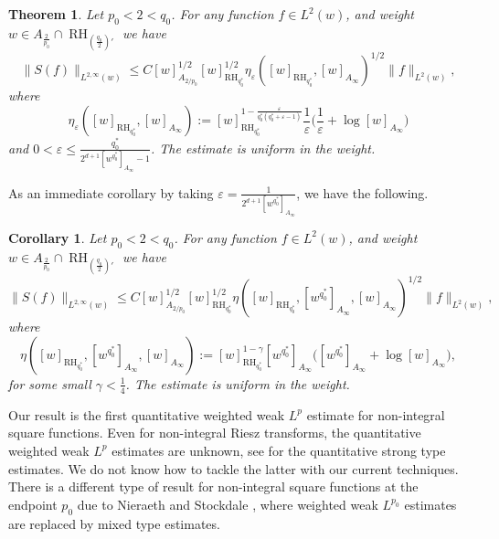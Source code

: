 \documentclass[11pt,reqno]{amsart}
\theoremstyle{plain} %
\newtheorem{theorem}[equation]{Theorem}
\newtheorem{corollary}[equation]{Corollary}
\newcommand{\1}{ \mathbbm{1}}   %
\theoremstyle{definition}
\theoremstyle{remark}
\numberwithin{equation}{section}
\begin{document}
\begin{theorem} 
\label{thm:main}
Let $p_0<2<q_0$. For any function $f\in L^2(w)$, and weight $w\in A_{\frac{2}{p_0}}\cap \operatorname{RH}_{(\frac{q_0}{2})'}$ we have
$$
\|S(f)\|_{L^{2,\infty}(w)} \le C [w]_{A_{2/p_0}}^{1/2} [w]_{ \operatorname{RH}_{q_0^*}}^{1/2}\eta_{\varepsilon} ([w]_{ \operatorname{RH}_{q_0^*}}, [w]_{A_{\infty}})^{1/2}\|f\|_{L^2(w)},
$$
where  
\begin{equation}\label{e.excess}
\eta_{\varepsilon} ([w]_{ \operatorname{RH}_{q_0^*}}, [w]_{A_{\infty}}) := [w]_{ \operatorname{RH}_{q_0^*}}^{1-\frac{\varepsilon}{q_0^*(q_0^*+\varepsilon-1)}}   \frac{1}{\varepsilon} \Big(   \frac{1}{\varepsilon} +\log[w]_{A_{\infty}}\Big)
\end{equation}
and $0 < \varepsilon \leq \frac{q_0^*}{2^{d+1} [w^{q_0^*}]_{A_{\infty}}-1 }$.
The estimate is uniform in the weight.
\end{theorem}

As an immediate corollary by taking $\varepsilon = \frac{1}{2^{d+1} [w^{q_0^*}]_{A_{\infty}}} $, we have the following.
\begin{corollary}
\label{cor:explicit}
  Let $p_0<2<q_0$. For any function $f\in L^2(w)$, and weight $w\in A_{\frac{2}{p_0}}\cap \operatorname{RH}_{(\frac{q_0}{2})'}$ we have
$$
\|S(f)\|_{L^{2,\infty}(w)} \le C [w]_{A_{2/p_0}}^{1/2} [w]_{ \operatorname{RH}_{q_0^*}}^{1/2}\eta([w]_{ \operatorname{RH}_{q_0^*}}, [w^{q_0^*}]_{A_{\infty}},[w]_{A_{\infty}})^{1/2}\|f\|_{L^2(w)},
$$
where  
\begin{equation}\label{e.excessbis}
\eta ([w]_{ \operatorname{RH}_{q_0^*}},[w^{q_0^*}]_{A_{\infty}}, [w]_{A_{\infty}}) := [w]_{ \operatorname{RH}_{q_0^*}}^{1-\gamma}   [w^{q_0^*}]_{A_{\infty}} \big(  [w^{q_0^*}]_{A_{\infty}} +\log[w]_{A_{\infty}}\big),
\end{equation}
for some small $\gamma<\frac14$. The estimate is uniform in the weight.  
\end{corollary}


Our result is the first quantitative weighted weak $L^p$ estimate for non-integral square functions. Even for non-integral Riesz transforms, the quantitative weighted weak $L^p$ estimates are unknown, see \cite{BFP} for the quantitative strong type estimates. We do not know how to tackle the latter with our current techniques. There is a different type of result for non-integral square functions at the endpoint $p_0$ due to Nieraeth and Stockdale \cite{NS}, where weighted weak $L^{p_0}$ estimates are replaced by mixed type estimates.
\end{document}
